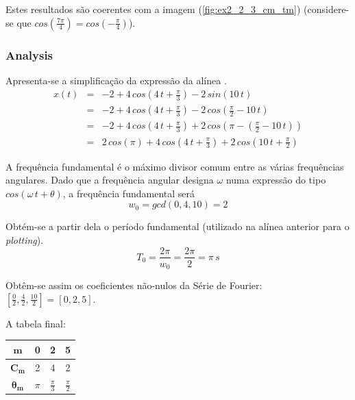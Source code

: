 \documentclass[a4paper]{article}
\begin{document}
\noindent Estes resultados são coerentes com a imagem (\ref{fig:ex2_2_3_cm_tm}) (considere-se que $cos\left(\frac{7 \pi}{4}\right) = cos\left(-\frac{\pi}{4}\right)$).

\subsubsection{ Analysis}
\noindent Apresenta-se a simplificação da expressão da alínea \emph{}.
\begin{eqnarray}
	x(t) & = & -2 + 4 \, cos\left(4 \, t + \frac{\pi}{3}\right) - 2 \, sin(10 \, t) \\
	& = & -2 + 4 \, cos\left(4 \, t + \frac{\pi}{3}\right) - 2 \, cos\left(\frac{\pi}{2} - 10 \, t\right) \\
	& = & -2 + 4 \, cos\left(4 \, t + \frac{\pi}{3}\right) + 2 \, cos\left(\pi - \left(\frac{\pi}{2} - 10 \, t\right)\right) \\
	& = & 2 \, cos(\pi) + 4 \, cos\left(4 \, t + \frac{\pi}{3}\right) + 2 \, cos\left(10 \, t + \frac{\pi}{2}\right)
\end{eqnarray}

\noindent A frequência fundamental é o máximo divisor comum entre as várias frequências angulares. Dado que a frequência angular designa $\omega$ numa expressão do tipo $cos(\omega \, t + \theta)$, a frequência fundamental será
\begin{equation}
	w_0 = gcd(0, 4, 10) = 2
\end{equation}

\noindent Obtém-se a partir dela o período fundamental (utilizado na alínea anterior para o \emph{plotting}).
\begin{equation}
	T_0 = \frac{2 \pi}{w_0} = \frac{2 \pi}{2} = \pi \, s
\end{equation}

\noindent Obtêm-se assim os coeficientes não-nulos da Série de Fourier: $\left[\frac{0}{2}, \frac{4}{2}, \frac{10}{2}\right] = [0, 2, 5]$.

\noindent A tabela final:

\begin{center}
	\begin{tabular}{|c|c|c|c|}
		\hline
		$\mathbf{m}$ & 0 & 2 & 5 \\
		\hline
		$\mathbf{C_m}$ & 2 & 4 & 2 \\
		\hline
		$\mathbf{\theta_m}$ & $\pi$ & $\frac{\pi}{3}$ & $\frac{\pi}{2}$ \\
		\hline
	\end{tabular}
	\label{tab:ex_2_1_3}
\end{center}
\end{document}
